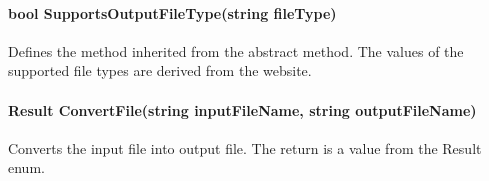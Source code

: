         \paragraph{bool SupportsOutputFileType(string fileType)}
            \hfill \break
            Defines the method inherited from the abstract method.  The values of the supported file types are derived from the website.

        \paragraph{Result ConvertFile(string inputFileName, string outputFileName)}
            \hfill \break
            Converts the input file into output file.  The return is a value from the Result enum.
        
        